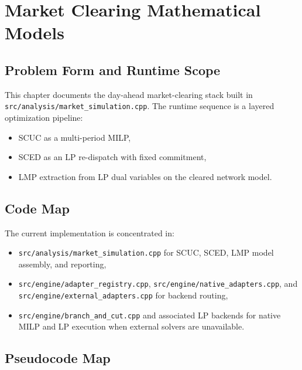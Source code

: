 %
\newpage
\section{Market Clearing Mathematical Models}\label{sec:market-clearing}

\subsection{Problem Form and Runtime Scope}

This chapter documents the day-ahead market-clearing stack built in
\texttt{src/analysis/market\_simulation.cpp}.  The runtime sequence is a layered
optimization pipeline:
\begin{itemize}
  \item SCUC as a multi-period MILP,
  \item SCED as an LP re-dispatch with fixed commitment,
  \item LMP extraction from LP dual variables on the cleared network model.
\end{itemize}

\subsection{Code Map}

The current implementation is concentrated in:
\begin{itemize}
  \item \texttt{src/analysis/market\_simulation.cpp} for SCUC, SCED, LMP model assembly, and reporting,
  \item \texttt{src/engine/adapter\_registry.cpp}, \texttt{src/engine/native\_adapters.cpp}, and \texttt{src/engine/external\_adapters.cpp} for backend routing,
  \item \texttt{src/engine/branch\_and\_cut.cpp} and associated LP backends for native MILP and LP execution when external solvers are unavailable.
\end{itemize}

\subsection{Pseudocode Map}

